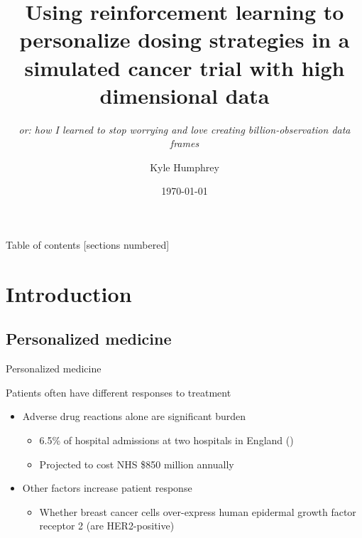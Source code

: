 \documentclass{beamer}
\title{Using reinforcement learning to personalize dosing strategies in a simulated cancer trial with high dimensional data}
\subtitle{\sl or: how I learned to stop worrying and love creating billion-observation data frames}
\date{\today}
\author{Kyle Humphrey}
\institute{University of Arizona}
\begin{document}
\maketitle

\begin{frame}[c]{Table of contents}
  [sections numbered]
  \tableofcontents
\end{frame}

\section{Introduction}

\subsection{Personalized medicine} %
\label{sub:personalized_medicine}

\begin{frame}[c]{Personalized medicine}

Patients often have different responses to treatment
\begin{itemize}[<+(1)->]
  \item Adverse drug reactions alone are significant burden 
  \begin{itemize}
    \item 6.5\% of hospital admissions at two hospitals in England  (\cite{Pirmohamed2004})
    \item Projected to cost NHS \$850 million annually 
  \end{itemize}
  \item Other factors increase patient response
  \begin{itemize}
    \item Whether breast cancer cells over-express human epidermal growth factor receptor 2 (are HER2-positive)\footnotemark 
  \end{itemize}
\end{itemize}


\end{frame}
\end{document}
